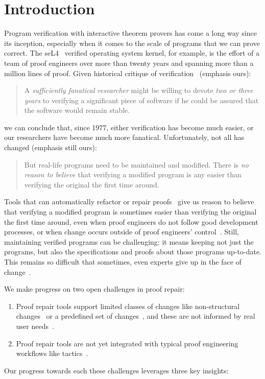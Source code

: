 \section{Introduction}

Program verification with interactive theorem provers has come a long way since its inception,
especially when it comes to the scale of programs that we can prove correct.
The seL4~\cite{Klein2009} verified operating system kernel, for example,
is the effort of a team of proof engineers over more than twenty years and spanning more than
a million lines of proof.
Given historical critique of verification~\cite{DeMillo1977} (emphasis ours):

\begin{quote}
A \textit{sufficiently fanatical researcher}
might be willing to devote \textit{two or 
three years} to verifying a significant 
piece of software if he could be 
assured that the software would remain stable.
\end{quote}
we can conclude that, since 1977, either verification has become much easier,
or our researchers have become much more fanatical. Unfortunately, not all has changed (emphasis still ours):

\begin{quote}
But real-life programs need to 
be maintained and modified. 
There is \textit{no reason to believe} that verifying a modified program is any 
easier than verifying the original the 
first time around.
\end{quote}
Tools that can automatically refactor or repair proofs~\cite{wibergh2019, WhitesidePhD, Dietrich2013, adams2015, Bourke12, Roe2016, robert2018, pumpkinpatch}
give us reason to believe that verifying a modified program is sometimes easier than verifying the original the first time
around, even when proof engineers do not follow good development processes,
or when change occurs outside of proof engineers' control~\cite{PGL-045}.
Still, maintaining verified programs can be challenging: it means keeping not just the programs, but also the
specifications and proofs about those programs up-to-date.
This remains so difficult that sometimes, even experts give up in the face of change~\cite{replica}.

We make progress on two open challenges in proof repair:

\begin{enumerate}
\item Proof repair tools support limited classes of changes like non-structural changes~\cite{pumpkinpatch} or a predefined set
of changes~\cite{robert2018, wibergh2019}, and these are not informed by real user needs~\cite{replica}.
\item Proof repair tools are not yet integrated with typical proof engineering workflows like tactics~\cite{PGL-045, pumpkinpatch, robert2018}.
\end{enumerate}
Our progress towards each these challenges leverages three key insights: %

